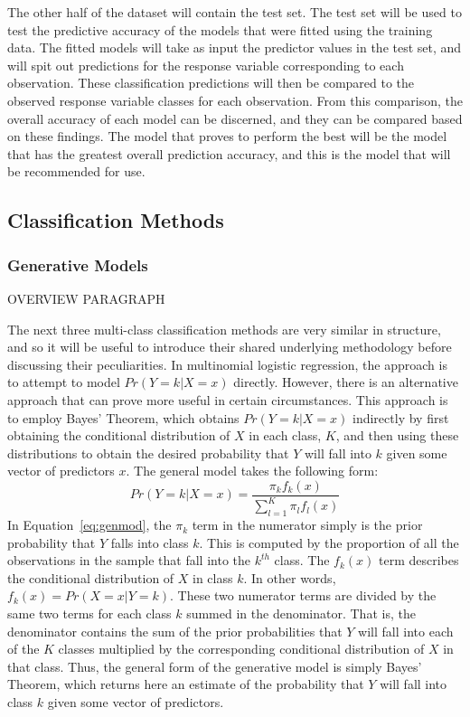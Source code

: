 \documentclass[12pt]{article}
\begin{document}
The other half of the dataset will contain the test set.  The test set will be used to 
test the predictive accuracy of the models that were fitted using the training data.  
The fitted models will take as input the predictor values in the test set, and will 
spit out predictions for the response variable corresponding to each observation.  
These classification predictions will then be compared to the observed response variable 
classes for each observation.  From this comparison, the overall accuracy of each model 
can be discerned, and they can be compared based on these findings.  The model that 
proves to perform the best will be the model that has the greatest overall prediction 
accuracy, and this is the model that will be recommended for use. 


\subsection{Classification Methods}
\label{sec:class}

\subsubsection{Generative Models}
\label{sec:gm}

OVERVIEW PARAGRAPH

The next three multi-class classification methods are very similar in structure, 
and so it will be useful to introduce their shared underlying methodology before 
discussing their peculiarities.  In multinomial logistic regression, the approach 
is to attempt to model $Pr( Y = k|X = x)$ directly.  However, there is an 
alternative approach that can prove more useful in certain circumstances.  This 
approach is to employ Bayes' Theorem, which obtains $Pr( Y = k | X = x)$ indirectly 
by first obtaining the conditional distribution of $X$ in each class, $K$, and then 
using these distributions to obtain the desired probability that $Y$ will fall into 
$k$ given some vector of predictors $x$.  The general model takes the following form:
\begin{equation}
  \label{eq:genmod}
  Pr(Y = k | X = x) =
  \frac{\pi_k f_k(x)} {\sum_{l = 1} ^ {K} \pi_l f_l(x)}
\end{equation}
In Equation~\eqref{eq:genmod}, the $\pi_k$ term in the numerator simply is the prior 
probability that $Y$ falls into class $k$.  This is computed by the proportion of all 
the observations in the sample that fall into the $k ^ {th}$ class.  The $f_k(x)$ term 
describes the conditional distribution of $X$ in class $k$.  In other words, 
$f_k(x) = Pr(X = x | Y = k)$.  These two numerator terms are divided by the same two 
terms for each class $k$ summed in the denominator.  That is, the denominator contains 
the sum of the prior probabilities that $Y$ will fall into each of the $K$ classes 
multiplied by the corresponding conditional distribution of $X$ in that class.  Thus, 
the general form of the generative model is simply Bayes' Theorem, which returns here 
an estimate of the probability that $Y$ will fall into class $k$ given some vector of 
predictors.  
\end{document}
